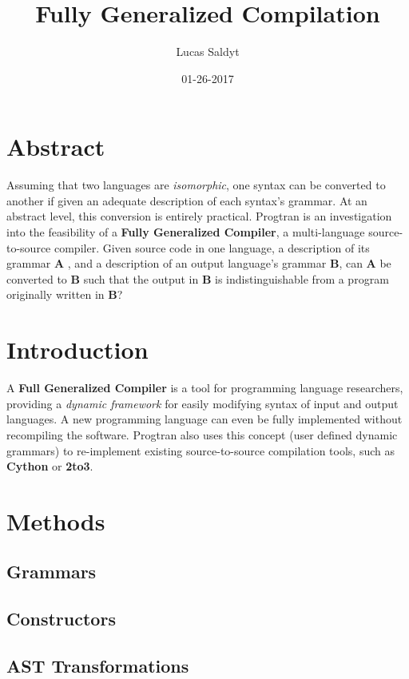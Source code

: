 \documentclass{article}
\title{Fully Generalized Compilation}
\date{01-26-2017}
\author{Lucas Saldyt}
\begin{document}
\maketitle
{}
\newpage
{}

\section{Abstract}

Assuming that two languages are \textit{isomorphic}, one syntax can be converted to another if given an adequate description of each syntax's grammar.
At an abstract level, this conversion is entirely practical. 
Progtran is an investigation into the feasibility of a \textbf{Fully Generalized Compiler}, a multi-language source-to-source compiler. 
Given source code in one language, a description of its grammar \textbf{A} , and a description of an output language's grammar \textbf{B}, can \textbf{A} be converted to \textbf{B} such that the output in \textbf{B} is indistinguishable from a program originally written in \textbf{B}?

\section{Introduction}

A \textbf{Full Generalized Compiler} is a tool for programming language researchers, providing a \textit{dynamic framework} for easily modifying syntax of input and output languages. 
A new programming language can even be fully implemented without recompiling the software. 
Progtran also uses this concept (user defined dynamic grammars) to re-implement existing source-to-source compilation tools, such as \textbf{Cython} or \textbf{2to3}.

\section{Methods}


\subsection{Grammars}
\subsection{Constructors}
\subsection{AST Transformations}
\end{document}
